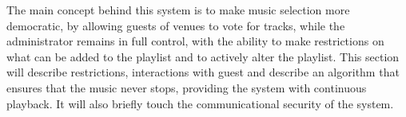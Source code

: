 The main concept behind this system is to make music selection more democratic, by allowing guests of venues to vote for tracks, while the administrator remains in full control, with the ability to make restrictions on what can be added to the playlist and to actively alter the playlist. This section will describe restrictions, interactions with guest and describe an algorithm that ensures that the music never stops, providing the system with continuous playback. It will also briefly touch the communicational security of the system.